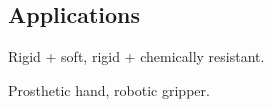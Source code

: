 \subsection{Applications}
Rigid + soft, rigid + chemically resistant.

Prosthetic hand, robotic gripper.
